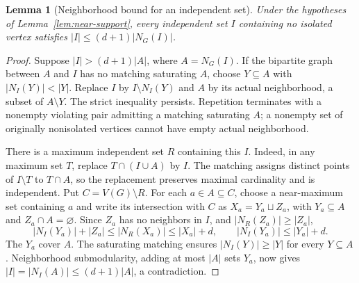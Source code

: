 \documentclass[11pt]{article}
\newtheorem{lemma}[theorem]{Lemma}
\theoremstyle{definition}
\theoremstyle{plain}
\begin{document}
\begin{lemma}[Neighborhood bound for an independent set]\label{lem:neighborhood-ratio}
Under the hypotheses of Lemma~\ref{lem:near-support}, every independent
set $I$ containing no isolated vertex satisfies
$|I|\le(d+1)|N_G(I)|$.
\end{lemma}
\begin{proof}
Suppose $|I|>(d+1)|A|$, where $A=N_G(I)$.
If the bipartite graph between $A$ and $I$ has no matching saturating $A$,
choose $Y\subseteq A$ with $|N_I(Y)|<|Y|$. Replace $I$ by
$I\setminus N_I(Y)$ and $A$ by its actual neighborhood, a subset of
$A\setminus Y$. The strict inequality persists. Repetition terminates
with a nonempty violating pair admitting a matching saturating $A$;
a nonempty set of originally nonisolated vertices cannot have empty
actual neighborhood.

There is a maximum independent set $R$ containing this $I$.
Indeed, in any maximum set $T$, replace $T\cap(I\cup A)$ by $I$.
The matching assigns distinct points of $I\setminus T$ to $T\cap A$,
so the replacement preserves maximal cardinality and is independent.
Put $C=V(G)\setminus R$. For each $a\in A\subseteq C$, choose a
near-maximum set containing $a$ and write its intersection with $C$
as $X_a=Y_a\sqcup Z_a$, with $Y_a\subseteq A$ and $Z_a\cap A=\varnothing$.
Since $Z_a$ has no neighbors in $I$, and $|N_R(Z_a)|\ge|Z_a|$,
\[
 |N_I(Y_a)|+|Z_a|\le|N_R(X_a)|\le|X_a|+d,
 \qquad |N_I(Y_a)|\le|Y_a|+d.
\]
The $Y_a$ cover $A$. The saturating matching ensures
$|N_I(Y)|\ge|Y|$ for every $Y\subseteq A$.
Neighborhood submodularity, adding at most $|A|$ sets $Y_a$, now gives
$|I|=|N_I(A)|\le(d+1)|A|$, a contradiction.
\end{proof}
\end{document}
